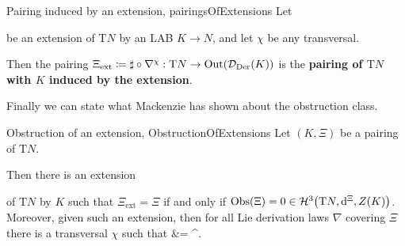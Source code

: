 \begin{definitions}{Pairing induced by an extension, \newline \cite[\S7.3, Definition 7.3.4, replace $A$ with $\mathrm{T}N$ and $A^\prime$ with $E$; page 278]{mackenzieGeneralTheory}}{pairingsOfExtensions}
Let
\begin{center}
\end{center}
be an extension of $\mathrm{T}N$ by an LAB $K \to N$, and let $\chi$ be any transversal.

Then the pairing $\Xi_{\mathrm{ext}} \coloneqq \sharp \circ \nabla^\chi: \mathrm{T}N \to \mathrm{Out}\mleft( \mathcal{D}_{\mathrm{Der}}(K) \mright)$ is the \textbf{pairing of $\mathrm{T}N$ with $K$ induced by the extension}.
\end{definitions}

Finally we can state what Mackenzie has shown about the obstruction class.

\begin{theorems}{Obstruction of an extension, \newline \cite[\S 7.3, Proposition 7.3.6, page 279, Corollary 7.3.9 and the comment afterwards, page 281; replace $A$ with $\mathrm{T}N$ and $A^\prime$ with $E$]{mackenzieGeneralTheory}}{ObstructionOfExtensions}
Let $(K, \Xi)$ be a pairing of $\mathrm{T}N$.

Then there is an extension
\begin{center}
\end{center}
of $\mathrm{T}N$ by $K$ such that $\Xi_{\mathrm{ext}} = \Xi$ if and only if $\mathrm{Obs}(\Xi) = 0 \in \mathcal{H}^3\mleft(\mathrm{T}N, \mathrm{d}^\Xi, Z(K)\mright)$. Moreover, given such an extension, then for all Lie derivation laws $\nabla$ covering $\Xi$ there is a transversal $\chi$ such that
\bas
\nabla
&=
\nabla^\chi.
\eas
\end{theorems}

